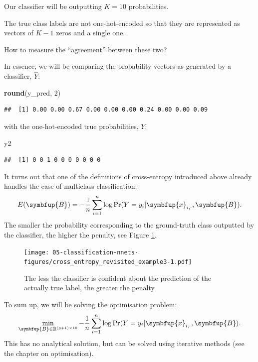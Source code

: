 \documentclass[10pt,b5paper,krantz1]{krantz}
\newenvironment{Shaded}{\begin{snugshade}}{\end{snugshade}}
\newcommand{\DecValTok}[1]{\textcolor[rgb]{0.06,0.06,0.06}{#1}}
\newcommand{\KeywordTok}[1]{\textcolor[rgb]{0.27,0.27,0.27}{\textbf{#1}}}
\newcommand{\NormalTok}[1]{#1}
\renewcommand{\mathbf}[1]{\symbfup{#1}}
\begin{document}
Our classifier will be outputting \(K=10\) probabilities.

The true class labels are not one-hot-encoded so that they
are represented as vectors of \(K-1\) zeros and a single one.

How to measure the ``agreement'' between these two?

\bigskip

In essence, we will be comparing
the probability vectors as generated by a classifier, \(\hat{Y}\):

\begin{Shaded}
\begin{Highlighting}[]
\KeywordTok{round}\NormalTok{(y_pred, }\DecValTok{2}\NormalTok{)}
\end{Highlighting}
\end{Shaded}

\begin{verbatim}
##  [1] 0.00 0.00 0.67 0.00 0.00 0.00 0.24 0.00 0.00 0.09
\end{verbatim}

with the one-hot-encoded true probabilities, \(Y\):

\begin{Shaded}
\begin{Highlighting}[]
\NormalTok{y2}
\end{Highlighting}
\end{Shaded}

\begin{verbatim}
##  [1] 0 0 1 0 0 0 0 0 0 0
\end{verbatim}

It turns out that one of the definitions of cross-entropy introduced above
already handles the case of multiclass classification:
\[
E(\mathbf{B}) =
-\frac{1}{n} \sum_{i=1}^n
\log \Pr(Y=y_i|\mathbf{x}_{i,\cdot},\mathbf{B}).
\]
The smaller the probability corresponding to the ground-truth class
outputted by the classifier, the higher the penalty, see
Figure \ref{fig:cross_entropy_revisited_example3}.

\begin{figure}
\hypertarget{fig:cross_entropy_revisited_example3}{%
\centering
\texttt{[image: 05-classification-nnets-figures/cross\_entropy\_revisited\_example3-1.pdf]}
\caption{The less the classifier is confident about the prediction of the actually true label, the greater the penalty}\label{fig:cross_entropy_revisited_example3}
}
\end{figure}

To sum up, we will be solving the optimisation problem:
\[
\min_{\mathbf{B}\in\mathbb{R}^{(p+1)\times 10}}
-\frac{1}{n} \sum_{i=1}^n
\log \Pr(Y=y_i|\mathbf{x}_{i,\cdot},\mathbf{B}).
\]
This has no analytical solution,
but can be solved using iterative methods
(see the chapter on optimisation).
\end{document}
